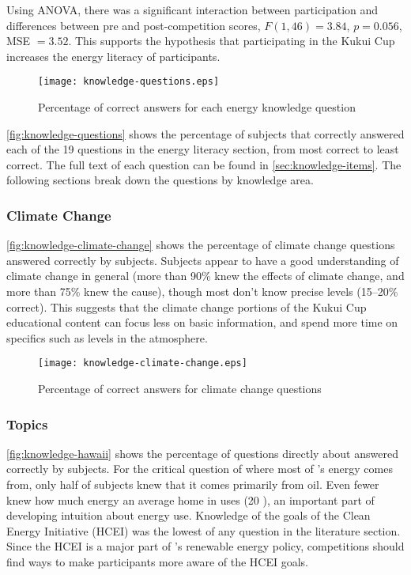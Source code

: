 Using ANOVA, there was a significant interaction between participation and differences between pre and post-competition scores, \(F(1, 46) = 3.84\), \(p = 0.056\), MSE \(= 3.52\). This supports the hypothesis that participating in the Kukui Cup increases the energy literacy of participants.

\begin{figure}[htbp]
	\centering
		\texttt{[image: knowledge-questions.eps]}
		\caption[Plot of energy knowledge before and after competition]{Percentage of correct answers for each energy knowledge question}
\label{fig:knowledge-questions}
\end{figure}

\autoref{fig:knowledge-questions} shows the percentage of subjects that correctly answered each of the 19 questions in the energy literacy section, from most correct to least correct. The full text of each question can be found in \autoref{sec:knowledge-items}. The following sections break down the questions by knowledge area.


\subsubsection{Climate Change}

\autoref{fig:knowledge-climate-change} shows the percentage of climate change questions answered correctly by subjects. Subjects appear to have a good understanding of climate change in general (more than 90\% knew the effects of climate change, and more than 75\% knew the cause), though most don't know precise \COtwo levels (15--20\% correct). This suggests that the climate change portions of the Kukui Cup educational content can focus less on basic information, and spend more time on specifics such as \COtwo levels in the atmosphere.

\begin{figure}[htbp]
	\centering
		\texttt{[image: knowledge-climate-change.eps]}
		\caption{Percentage of correct answers for climate change questions}
\label{fig:knowledge-climate-change}
\end{figure}


\subsubsection{\Hawaii Topics}

\autoref{fig:knowledge-hawaii} shows the percentage of questions directly about \Hawaii answered correctly by subjects. For the critical question of where most of \Hawaii's energy comes from, only half of subjects knew that it comes primarily from oil. Even fewer knew how much energy an average home in \Hawaii uses (20 \kWh), an important part of developing intuition about energy use. Knowledge of the goals of the \Hawaii Clean Energy Initiative (HCEI) was the lowest of any question in the literature section. Since the HCEI is a major part of \Hawaii's renewable energy policy, competitions should find ways to make participants more aware of the HCEI goals.


